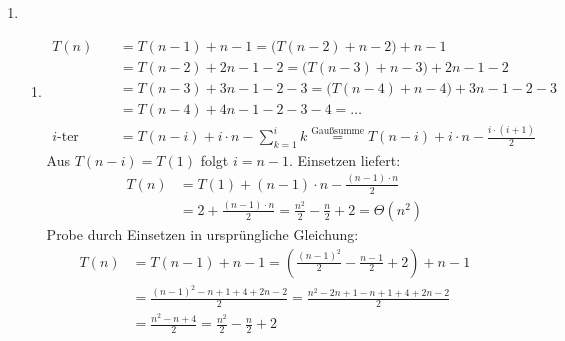 \documentclass[11pt,a4paper]{article}
\begin{document}
\begin{loesung}
\begin{enumerate}
    \item
    \begin{enumerate}[label=\roman*)]
        \item 
        \begin{align*}
            T(n) &= T(n - 1) + n - 1= \big(T(n - 2) + n - 2\big) + n - 1 \\
            &= T(n - 2) + 2n - 1 - 2 = \big(T(n - 3) + n - 3\big) + 2n - 1 - 2 \\
            &= T(n - 3) + 3n - 1 - 2 - 3 = \big(T(n - 4) + n - 4\big) + 3n - 1 - 2 - 3 \\
            &= T(n - 4) + 4n - 1 - 2 - 3 - 4 = \ldots \\
            \text{$i$-ter Schritt: } &= T(n - i) + i \cdot n - \sum\limits_{k = 1}^{i} k \overset{\text{Gaußsumme}}{=} T(n - i) + i \cdot n - \frac{i \cdot (i + 1)}{2}
        \end{align*}
        Aus $T(n - i) = T(1)$ folgt $i = n - 1$. Einsetzen liefert:
        \begin{align*}
            T(n) &= T(1) + (n - 1) \cdot n - \frac{(n - 1) \cdot n}{2} \\
            &= 2 + \frac{(n - 1) \cdot n}{2} = \frac{n^2}{2} - \frac{n}{2} + 2 = \Theta(n^2)
        \end{align*}
        Probe durch Einsetzen in ursprüngliche Gleichung:
        \begin{align*}
            T(n) &= T(n - 1) + n - 1
            = \left(\frac{(n - 1)^2}{2} - \frac{n - 1}{2}  + 2\right) + n - 1 \\
            &= \frac{(n - 1)^2 - n + 1 + 4 + 2n - 2}{2} 
            = \frac{n^2 - 2n + 1 - n + 1 + 4 + 2n - 2}{2} \\
            &= \frac{n^2 - n + 4}{2} = \frac{n ^2}{2} - \frac{n}{2} + 2
        \end{align*}


\end{enumerate}
\end{enumerate}
\end{loesung}
\end{document}
